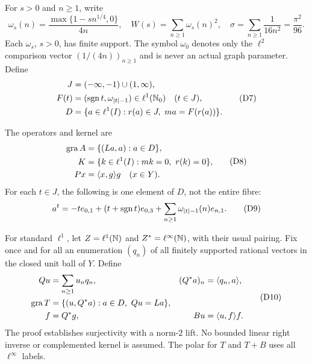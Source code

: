 For $s>0$ and $n\ge1$, write
\begin{equation}
\omega_s(n)=\frac{\max\{1-sn^{1/4},0\}}{4n},\quad
W(s)=\sum_{n\ge1}\omega_s(n)^2,\quad
\sigma=\sum_{n\ge1}\frac1{16n^2}=\frac{\pi^2}{96}.
\tag{D6}\label{eq:D6}
\end{equation}
Each $\omega_s$, $s>0$, has finite support. The symbol $\omega_0$ denotes only
the $\ell^2$ comparison vector $(1/(4n))_{n\ge1}$ and is never an actual
graph parameter. Define
\begin{equation}
\begin{aligned}
J&=(-\infty,-1)\cup(1,\infty),\\
F(t)&=(\operatorname{sgn} t,\omega_{|t|-1})\in\ell^1(\mathbb N_0)\quad(t\in J),\\
D&=\{a\in\ell^1(I):r(a)\in J,\ ma=F(r(a))\}.
\end{aligned}
\tag{D7}\label{eq:D7}
\end{equation}

The operators and kernel are
\begin{equation}
\begin{aligned}
\operatorname{gra} A&=\{(La,a):a\in D\},\\
K&=\{k\in\ell^1(I):mk=0,\ r(k)=0\},\\
Px&=\langle x,g\rangle g\quad(x\in Y).
\end{aligned}
\tag{D8}\label{eq:D8}
\end{equation}
For each $t\in J$, the following is one element of $D$, not the entire fibre:
\begin{equation}
a^t=-t e_{0,1}+(t+\operatorname{sgn} t)e_{0,3}
       +\sum_{n\ge1}\omega_{|t|-1}(n)e_{n,1}.
\tag{D9}\label{eq:D9}
\end{equation}


For standard $\ell^1$, let $Z=\ell^1(\mathbb N)$ and $Z^*=\ell^\infty(\mathbb N)$,
with their usual pairing. Fix once and for all an enumeration $(q_n)$ of
all finitely supported rational vectors in the closed unit ball of $Y$.
Define
\begin{equation}
\begin{aligned}
Qu&=\sum_{n\ge1}u_nq_n,& (Q^*a)_n&=\langle q_n,a\rangle,\\
\operatorname{gra} T&=\{(u,Q^*a):a\in D,\ Qu=La\},\\
f&=Q^*g,& Bu&=\langle u,f\rangle f.
\end{aligned}
\tag{D10}\label{eq:D10}
\end{equation}
The proof establishes surjectivity with a norm-$2$ lift. No bounded linear
right inverse or complemented kernel is assumed. The polar for $T$ and
$T+B$ uses all $\ell^\infty$ labels.


